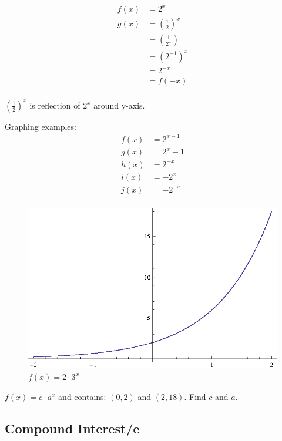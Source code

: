 \documentclass{exam}
\begin{document}
  \begin{align*}
    f(x) &= 2^x \\
    g(x) &= \left( \frac{1}{2} \right)^x \\
         &= \left( \frac{1}{2^x} \right) \\
         &= \left( 2^{-1} \right)^x \\
         &= 2^{-x} \\
         &= f(-x) \\
  \end{align*}

  $\left( \frac{1}{2} \right)^x$ is reflection of $2^x$ around y-axis.

  Graphing examples:
  \begin{align*}
    f(x) &= 2^{x - 1} \\
    g(x) &= 2^x - 1 \\
    h(x) &= 2^{-x} \\
    i(x) &= -2^x \\
    j(x) &= -2^{-x} \\
  \end{align*}

  \pagebreak

  \begin{figure}[h]
    \centering
    \includegraphics{figure1.eps}
    \caption{$f(x) = 2 \cdot 3^x$}
    \label{fig:figure1}
  \end{figure}

  $f(x) = c \cdot a^x$ and contains: $(0, 2)$ and $(2, 18)$.  Find $c$ and $a$.

  \subsection{Compound Interest/e}
\end{document}
